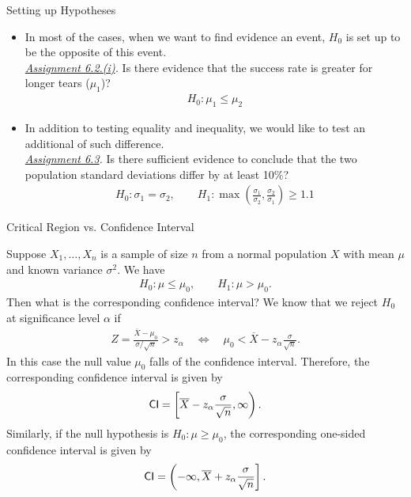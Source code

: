\begin{frame}{Setting up Hypotheses}


\begin{itemize}
	\justifying
	\item {} In most of the cases, when we want to find evidence  an event, $H_0$ is set up to be the opposite of this event. \\
	\emph{\underline{Assignment 6.2.(i)}.} Is there evidence that the success rate is greater for longer tears ($\mu_1$)?
	\begin{align*}
	H_0: \mu_1\leq \mu_2
	\end{align*}
	\item {} In addition to testing equality and inequality, we would like to test an additional  of such difference.\\
	\emph{\underline{Assignment 6.3}.} Is there sufficient evidence to conclude that the two population standard deviations differ by at least 10\%?
	\begin{align*}
	H_0: \sigma_1 = \sigma_2, \qquad H_1: \max\left(\frac{\sigma_1}{\sigma_2}, \frac{\sigma_2}{\sigma_1} \right) \geq 1.1
	\end{align*}
\end{itemize}


\end{frame}



\begin{frame}{Critical Region vs. Confidence Interval}

\justifying
Suppose $X_1, \ldots, X_n$ is a sample of size $n$ from a normal population $X$ with mean $\mu$ and known variance $\sigma^2$. We have
\footnotesize
\begin{align*}
H_0: \mu \leq \mu_0, \qquad H_1: \mu > \mu_0.
\end{align*}
\normalsize
Then  what is the corresponding confidence interval? We know that we reject $H_0$ at significance level $\alpha$ if
\footnotesize
\begin{align*}
Z = \frac{\overline{X} - \mu_0}{\sigma/\sqrt{n}} > z_{\alpha}\quad\Leftrightarrow \quad \mu_0 < \overline{X} - z_{\alpha}\frac{\sigma}{\sqrt{n}}.
\end{align*}
\normalsize
In this case the null value $\mu_0$ falls  of the confidence interval. Therefore, the corresponding confidence interval is given by
\footnotesize
\begin{align*}
\mathsf{CI} = \left[\overline{X} - z_{\alpha}\frac{\sigma}{\sqrt{n}}, \infty \right).
\end{align*}
\normalsize
Similarly, if the null hypothesis is $H_0: \mu\geq \mu_0$, the corresponding one-sided confidence interval is given by
\footnotesize
\begin{align*}
\mathsf{CI} = \left(-\infty, \overline{X} + z_{\alpha}\frac{\sigma}{\sqrt{n}} \right].
\end{align*}
\normalsize



\end{frame}
